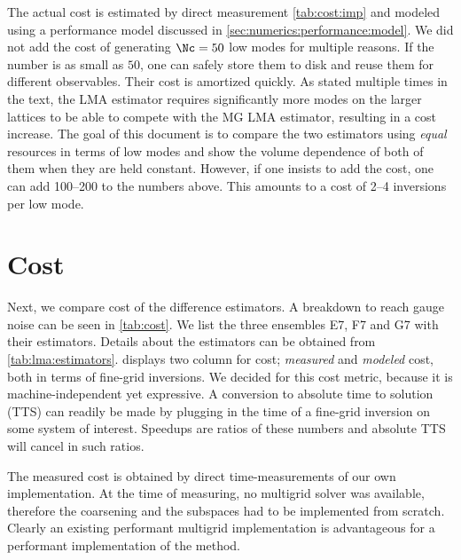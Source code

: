 \begin{table}[b!]
\begin{threeparttable}
{The actual cost is estimated by direct measurement \cref{tab:cost:imp} and modeled using a performance model discussed in \cref{sec:numerics:performance:model}.
We did not add the cost of generating $\Nc=50$ low modes for multiple reasons. If the number is as small as $50$, one can safely store them to disk and reuse them for different observables.
Their cost is amortized quickly.
As stated multiple times in the text, the LMA estimator requires significantly more modes on the larger lattices to be able to compete with the MG LMA estimator, resulting in a cost increase.
The goal of this document is to compare the two estimators using \emph{equal} resources in terms of low modes and show the volume dependence of both of them when they are held constant.
However, if one insists to add the cost, one can add \numrange{100}{200} to the numbers above.
This amounts to a cost of \numrange{2}{4} inversions per low mode.
}
\end{threeparttable}
\end{table}

\section{Cost}
\label{sec:cost}

Next, we compare cost of the difference estimators.
A breakdown to reach gauge noise can be seen in \cref{tab:cost}.
We list the three ensembles E7, F7 and G7 with their estimators.
Details about the estimators can be obtained from \cref{tab:lma:estimators}.
 displays two column for cost; \emph{measured} and \emph{modeled} cost, both in terms of fine-grid inversions.
We decided for this cost metric, because it is machine-independent yet expressive.
A conversion to absolute time to solution (TTS) can readily be made by plugging in the time of a fine-grid inversion on some system of interest.
Speedups are ratios of these numbers and absolute TTS will cancel in such ratios.

The measured cost is obtained by direct time-measurements of our own implementation.
At the time of measuring, no multigrid solver was available, therefore the coarsening and the subspaces had to be implemented from scratch.
Clearly an existing performant multigrid implementation is advantageous for a performant implementation of the method.

